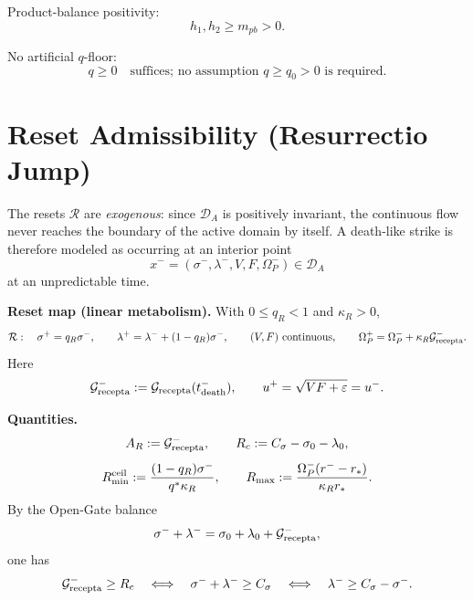 \documentclass[11pt,a4paper]{article}
\newcommand{\DA}{\mathcal D_A}
\newcommand{\Rcal}{\mathcal R}
\newcommand{\Grec}{\mathcal G_{\rm recepta}}
\newcommand{\Om}{\Omega_P}
\theoremstyle{remark}
\begin{document}
Product-balance positivity:
\begin{equation}
  h_1,h_2\ge m_{pb}>0.
\end{equation}

No artificial $q$-floor:
\begin{equation}
  q\ge0\quad\text{suffices; no assumption }q\ge q_0>0\text{ is required.}
\end{equation}

\section{Reset Admissibility (Resurrectio Jump)}

The resets $\Rcal$ are \emph{exogenous}: since $\DA$ is positively invariant, the
continuous flow never reaches the boundary of the active domain by itself. A death-like
strike is therefore modeled as occurring at an interior point
\begin{equation}
  x^-=(\sigma^-,\lambda^-,V,F,\Om^-)\in\DA
\end{equation}
at an unpredictable time.

\textbf{Reset map (linear metabolism).} With $0\le q_R<1$ and $\kappa_R>0$,
\begin{equation}
  \Rcal:\quad
  \sigma^+=q_R\sigma^-,\qquad
  \lambda^+=\lambda^-+(1-q_R)\sigma^-,\qquad
  (V,F)\ \text{continuous},\qquad
  \Om^+=\Om^-+\kappa_R\Grec^-.
\end{equation}
Here
\begin{equation}
  \Grec^-:=\Grec(t_{\rm death}^-),
  \qquad
  u^+=\sqrt{VF+\varepsilon}=u^-.
\end{equation}

\textbf{Quantities.}
\begin{equation}
  A_R:=\Grec^-,\qquad
  R_c:=C_\sigma-\sigma_0-\lambda_0,
\end{equation}
\begin{equation}
  R_{\min}^{\rm ceil}:=
  \frac{(1-q_R)\sigma^-}{q^*\kappa_R},
  \qquad
  R_{\max}:=
  \frac{\Om^-(r^--r_*)}{\kappa_R r_*}.
\end{equation}
By the Open-Gate balance
\begin{equation}
  \sigma^-+\lambda^-=
  \sigma_0+\lambda_0+\Grec^-,
\end{equation}
one has
\begin{equation}
  \Grec^-\ge R_c
  \quad\Longleftrightarrow\quad
  \sigma^-+\lambda^-\ge C_\sigma
  \quad\Longleftrightarrow\quad
  \lambda^-\ge C_\sigma-\sigma^-.
\end{equation}
\end{document}
